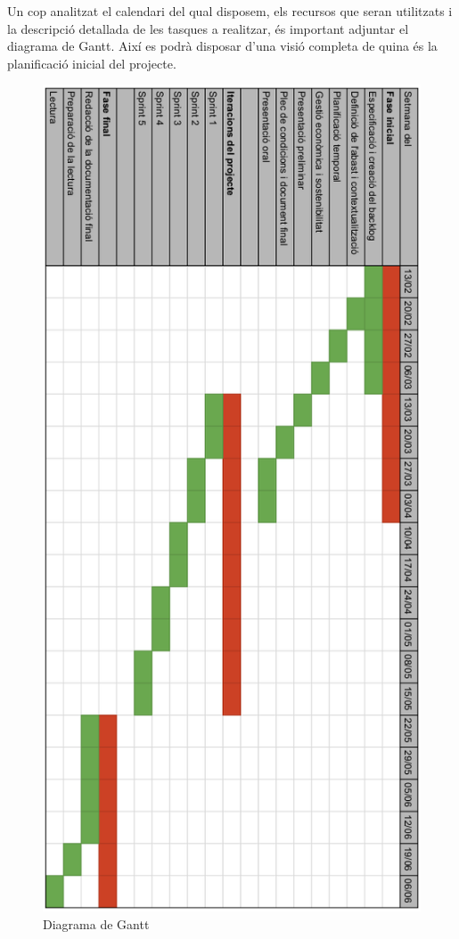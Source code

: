 Un cop analitzat el calendari del qual disposem, els recursos que seran utilitzats i la descripció detallada de les tasques a realitzar, és important adjuntar el diagrama de Gantt\cite{gantt}. Així es podrà disposar d'una visió completa de quina és la planificació inicial del projecte.
\\
\begin{figure}[H]
\centering
\includegraphics[scale=0.55]{Figures/gantt.png}
\caption{Diagrama de Gantt}
\end{figure}

